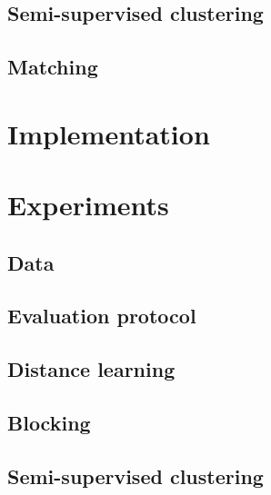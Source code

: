 \documentclass{article}
\begin{document}
\subsection{Semi-supervised clustering}

\subsection{Matching}



\section{Implementation}
\label{implementation}



\section{Experiments}
\label{experiments}

\subsection{Data}

\subsection{Evaluation protocol}

\subsection{Distance learning}

\subsection{Blocking}

\subsection{Semi-supervised clustering}
\end{document}
